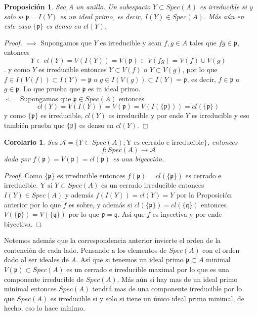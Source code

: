 \documentclass{article}
\newtheorem{corollary}{Corolario}
\newtheorem{proposition}{Proposición}
\begin{document}
\begin{proposition}
    Sea A un anillo. Un subespacio $Y \subset Spec(A)$
    es irreducible si y solo si $\mathfrak{p} = I(Y)$
    es un ideal primo, es decir, $I(Y) \in Spec(A)$.
    Más aún en este caso $\{\mathfrak{p}\}$ es denso en 
    $cl(Y)$.
\end{proposition}
\begin{proof}
    $\implies$ Supongamos que $Y$ es irreducible y sean 
    $f,g \in A$ tales que $fg \in \mathfrak{p}$, entonces
    $$Y \subset cl(Y) = V(I(Y)) = V(\mathfrak{p}) \subset V(fg) = V(f) \cup V(g)$$.
    y como $Y$ es irreducible entonces $Y \subset V(f)$ o $Y \subset V(g)$,
    por lo que $f \in I(V(f)) \subset I(Y) = \mathfrak{p}$
    o $g \in I(V(g)) \subset I(Y) = \mathfrak{p}$, es decir,
    $f \in \mathfrak{p}$ o $g \in \mathfrak{p}$. Lo que prueba
    que $\mathfrak{p}$ es in ideal primo.\\
    $\impliedby$ Supongamos que $\mathfrak{p} \in Spec(A)$
    entonces 
    $$cl(Y) = V(I(Y)) = V(\mathfrak{p}) = V(I(\{\mathfrak{p}\})) = cl(\{\mathfrak{p}\})$$
    y como $\{\mathfrak{p}\}$ es irreducible, $cl(Y)$ es irreducible y por ende
    $Y$ es irreducible y eso también prueba que $\{\mathfrak{p}\}$
    es denso en $cl(Y)$.
\end{proof}

\begin{corollary}
    Sea $\mathcal{A} = \{Y\subset Spec(A); \mbox{Y es cerrado e irreducible}\}$,
    entonces 
    $$f:Spec(A) \rightarrow \mathcal{A}$$ 
    dada por $f(\mathfrak{p}) = V(\mathfrak{p}) = cl(\mathfrak{p})$ es una biyección.
\end{corollary}
\begin{proof}
    Como $\{\mathfrak{p}\}$ es irreducible entonces
    $f(\mathfrak{p}) = cl(\{\mathfrak{p}\})$ es cerrado e irreducible.
    Y si $Y \subset Spec(A)$ es un cerrado irreducible entonces
    $I(Y) \in Spec(A)$ y además $f(I(Y)) = cl(Y) = Y$ por la Proposición anterior
    por lo que $f$ es sobre, y además si $cl(\{\mathfrak{p}\}) = cl(\{\mathfrak{q}\})$
    entonces $V(\{\mathfrak{p}\}) = V(\{\mathfrak{q}\})$ por lo que $\mathfrak{p} = \mathfrak{q}$.
    Asi que $f$ es inyectiva y por ende biyectiva.
\end{proof}

Notemos además que la correspondencia anterior
invierte el orden de la contención de cada lado.
Pensando a los elementos de $Spec(A)$ con el orden 
dado al ser ideales de $A$. Así que si tenemos un
ideal primo $\mathfrak{p} \subset A$ minimal 
$V(\mathfrak{p}) \subset Spec(A)$ es  un cerrado e 
irreducible maximal por lo que es una componente irreducible 
de $Spec(A)$. Más aún si hay mas de un ideal primo minimal
entonces $Spec(A)$ tendrá mas de una componente irreducible
por lo que $Spec(A)$ es irreducible si y solo si tiene un único
ideal primo minimal, de hecho, eso lo hace mínimo.
\end{document}
